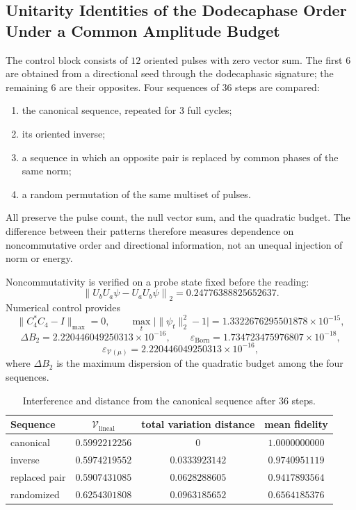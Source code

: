 \subsection{Unitarity Identities of the Dodecaphase Order Under a Common Amplitude Budget}

The control block consists of \(12\) oriented pulses with zero vector
sum. The first \(6\) are obtained from a directional seed through
the dodecaphasic signature; the remaining \(6\) are their opposites.
Four sequences of \(36\) steps are compared:
\begin{enumerate}
 \item the canonical sequence, repeated for \(3\) full cycles;
 \item its oriented inverse;
 \item a sequence in which an opposite pair is replaced by common phases
       of the same norm;
 \item a random permutation of the same multiset of pulses.
\end{enumerate}
All preserve the pulse count, the null vector sum, and the quadratic
budget. The difference between their patterns therefore measures dependence
on noncommutative order and directional information, not an
unequal injection of norm or energy.

Noncommutativity is verified on a probe state fixed before the
reading:
\[
 \left\|U_bU_a\psi-U_aU_b\psi\right\|_2
 =0.24776388825652637.
\]
Numerical control provides
\[
 \|C_4^*C_4-I\|_{\max}=0,
 \qquad
 \max_t\bigl|\|\psi_t\|_2^2-1\bigr|
 =1.3322676295501878\times10^{-15},
\]
\[
 \Delta B_2=2.220446049250313\times10^{-16},
 \qquad
 \varepsilon_{\mathrm{Born}}
 =1.734723475976807\times10^{-18},
\]
\[
 \varepsilon_{\mathcal V(\mu)}
 =2.220446049250313\times10^{-16},
\]
where \(\Delta B_2\) is the maximum dispersion of the quadratic budget among
the four sequences.

\begin{table}[tbp]
\centering
\caption{Interference and distance from the canonical sequence after \(36\) steps.}
\label{tab:md-sucesora-interferometro-resultados}
\begin{tabular}{lccc}
\toprule
Sequence & \(\mathcal V_{\mathrm{lineal}}\) &
total variation distance & mean fidelity \\
\midrule
canonical      & \(0.5992212256\) & \(0\)            & \(1.0000000000\) \\
inverse       & \(0.5974219552\) & \(0.0333923142\) & \(0.9740951119\) \\
replaced pair& \(0.5907431085\) & \(0.0628288605\) & \(0.9417893564\) \\
randomized  & \(0.6254301808\) & \(0.0963185652\) & \(0.6564185376\) \\
\bottomrule
\end{tabular}
\end{table}

